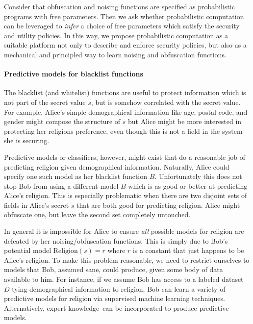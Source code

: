 \documentclass{article} %
\newcommand{\pxm}[1]{}
\theoremstyle{plain} %
\theoremstyle{definition} %
\begin{document}
Consider that obfuscation and noising functions are specified as probabilistic programs
with free parameters. Then we ask whether probabilistic computation can be leveraged to
\emph{infer} a choice of free parameters which satisfy the security and utility policies.
In this way, we propose probabilistic computation as a suitable platform not only to
describe and enforce security policies, but also as a mechanical and principled way
 to learn noising and obfuscation functions.
 
\paragraph*{Predictive models for blacklist functions} The blacklist
(and whitelist) functions are useful to protect information which is
not part of the secret value $ s $, but is somehow correlated with the
secret value. For example, Alice's simple demographical information
like age, postal code, and gender might compose the structure of $ s $
but Alice might be more interested in protecting her religions
preference, even though this is not a field in the system she is
securing.

Predictive models or classifiers, however, might exist that do a
reasonable job of predicting religion given demographical
information. Naturally, Alice could specify one such model as her
blacklist function $ B $. Unfortunately this does not stop Bob from
using a different model $ B $ which is as good or better at predicting
Alice's religion. This is especially problematic when there are two
disjoint sets of fields in Alice's secret $ s $ that are both good for
predicting religion. Alice might obfuscate one, but leave the second
set completely untouched.

In general it is impossible for Alice to ensure \emph{all} possible
models for religion are defeated by her noising/obfuscation
functions. This is simply due to Bob's potential model $
\text{Religion}(s) = r $ where $ r $ is a constant that just happens
to be Alice's religion. To make this problem reasonable, we need to
restrict ourselves to models that Bob, assumed sane, could produce,
given some body of data available to him. For instance, if we assume
Bob has access to a labeled dataset $ D $ tying demographical information
to religion, Bob can learn a variety of predictive models for religion
via supervised machine learning techniques. Alternatively, expert knowledge\
can be incorporated to produce predictive models.

\end{document}
